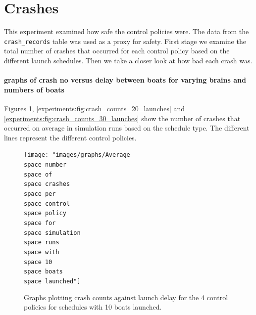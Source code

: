\section{Crashes}
This experiment examined how safe the control policies were. The data from the \texttt{crash\_records} table was used as a proxy for safety. First stage we examine the total number of crashes that occurred for each control policy based on the different launch schedules. Then we take a closer look at how bad each crash was.

  \paragraph{graphs of crash no versus delay between boats for varying brains and numbers of boats}
  Figures \ref{experiments:fig:crash_counts_10_launches}, \ref{experiments:fig:crash_counts_20_launches} and \ref{experiments:fig:crash_counts_30_launches} show the number of crashes that occurred on average in simulation runs based on the schedule type. The different lines represent the different control policies.
  
  \begin{figure}
  \begin{center}
    \texttt{[image: "images/graphs/Average\\space number\\space of\\space crashes\\space per\\space control\\space policy\\space for\\space simulation\\space runs\\space with\\space 10\\space boats\\space launched"]}
    \caption{Graphs plotting crash counts against launch delay for the 4 control policies for schedules with 10 boats launched.}
    \label{experiments:fig:crash_counts_10_launches}
  \end{center}
  \end{figure}
  
